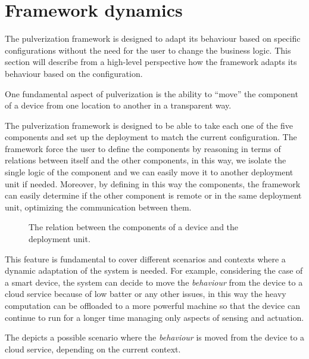 
\section{Framework dynamics}
\label{sec:framework-dynamics}

The pulverization framework is designed to adapt its behaviour based on specific configurations without the need for the user to change the
business logic. This section will describe from a high-level perspective how the framework adapts its behaviour based on the configuration.

One fundamental aspect of pulverization is the ability to ``move'' the component of a device from one location to another in a transparent way.

The pulverization framework is designed to be able to take each one of the five components and set up the deployment to match the current
configuration. The framework force the user to define the components by reasoning in terms of relations between itself and the other components,
in this way, we isolate the single logic of the component and we can easily move it to another deployment unit if needed.
Moreover, by defining in this way the components, the framework can easily determine if the other component is remote or in the same deployment unit,
optimizing the communication between them.

\begin{figure}[h]
    \centering
    \caption{The relation between the components of a device and the deployment unit.}
    \label{fig:framework-dynamics}
\end{figure}

This feature is fundamental to cover different scenarios and contexts where a dynamic adaptation of the system is needed. For example, considering
the case of a smart device, the system can decide to move the \emph{behaviour} from the device to a cloud service because of low batter or any other
issues, in this way the heavy computation can be offloaded to a more powerful machine so that the device can continue to run for a longer time
managing only aspects of sensing and actuation.

The  depicts a possible scenario where the \emph{behaviour} is moved from the device to a cloud service, depending on
the current context.
\begin{figure}
    \centering
    \caption{}
    \label{fig:dynamics-example}
\end{figure}

